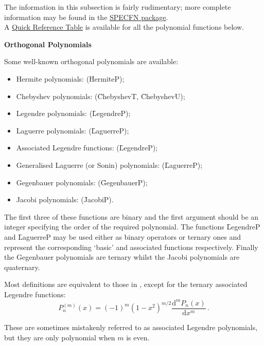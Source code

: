 The information in this subsection is fairly rudimentary; more complete
information may be found in the \hyperlink{POLYFN}{SPECFN package}.\\
A \hyperlink{SPECFNTAB4}{Quick Reference Table} is available for all the
polynomial functions below.

\textbf{Orthogonal Polynomials}
 

Some well-known orthogonal polynomials are available:
\begin{itemize}
\item Hermite polynomials: (\f{HermiteP});
\item Chebyshev polynomials: (\f{ChebyshevT}, \f{ChebyshevU});
\item Legendre polynomials: (\f{LegendreP});
\item Laguerre polynomials: (\f{LaguerreP});
\item Associated Legendre functions: (\f{LegendreP});
\item Generalised Laguerre (or Sonin) polynomials: (\f{LaguerreP});
\item Gegenbauer polynomials: (\f{GegenbauerP});
\item Jacobi polynomials: (\f{JacobiP}).
\end{itemize}
The first three of these functions are binary and the first
argument should be an integer specifying the order of the
required polynomial. The functions \f{LegendreP} and \f{LaguerreP} may be used
either as binary operators or ternary ones and represent the corresponding
`basic' and associated functions respectively.
Finally the Gegenbauer polynomials are ternary whilst the Jacobi polynomials
are quaternary.

Most definitions are equivalent to those in \cite{AbramowitzStegun:72},
except for the ternary associated Legendre functions:
\[P_n^{(m)}(x) = (-1)^m(1-x^2)^{m/2}\frac{\mathrm{d}^m P_n(x)}{\mathrm{d}x^m}\,.\]

These are sometimes mistakenly referred to as associated Legendre polynomials,
but they are only polynomial when $m$ is even.

